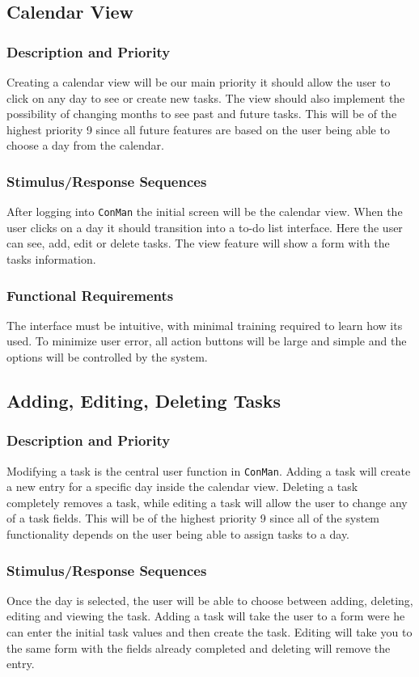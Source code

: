 \documentclass{article}
\begin{document}
\subsection{Calendar View}
\subsubsection{Description and Priority}
Creating a calendar view will be our main priority it should allow the user to click on any day to see or create new tasks.  The view should also implement the possibility of changing months to see past and future tasks. 
This will be of the highest priority 9 since all future features are based on the user being able to choose a day from the calendar.

\subsubsection{Stimulus/Response Sequences}
After logging into \texttt{ConMan} the initial screen will be the calendar view.  When the user clicks on a day it should transition into a to-do list interface. 
Here the user can see, add, edit or delete tasks. 
The view feature will show a form with the tasks information.

\subsubsection{Functional Requirements}
The interface must be intuitive, with minimal training required to learn how its used. 
To minimize user error, all action buttons will be large and simple and the options will be controlled by the system.

\subsection{Adding, Editing, Deleting Tasks}
\subsubsection{Description and Priority}
Modifying a task is the central user function in \texttt{ConMan}. 
Adding a task will create a new entry for a specific day inside the calendar view. Deleting a task completely removes a task, while editing a task will allow the user to change any of a task fields. 
This will be of the highest priority 9 since all of the system functionality depends on the user being able to assign tasks to a day.
\subsubsection{Stimulus/Response Sequences}
Once the day is selected, the user will be able to choose between adding, deleting, editing and viewing the task. 
Adding a task will take the user to a form were he can enter the initial task values and then create the task. 
Editing will take you to the same form with the fields already completed and deleting will remove the entry. 
\end{document}
